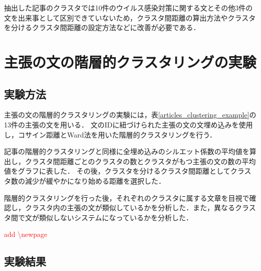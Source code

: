 \documentclass[12pt,a4j]{jreport}
\begin{document}
抽出した記事のクラスタでは10件のウイルス感染対策に関する文とその他3件の文を出来事として区別できていないため，クラスタ間距離の算出方法やクラスタを分けるクラスタ間距離の設定方法などに改善が必要である．

\section{主張の文の階層的クラスタリングの実験}
\label{section_sentence_clustering_experiment}

\subsection{実験方法}
主張の文の階層的クラスタリングの実験には，表\ref{articles_clustering_example}の13件の主張の文を用いる．
文のIDに紐づけられた主張の文の文埋め込みを使用し，コサイン距離とWard法を用いた階層的クラスタリングを行う．



記事の階層的クラスタリングと同様に全埋め込みのシルエット係数の平均値を算出し，クラスタ間距離ごとのクラスタの数とクラスタがもつ主張の文の数の平均値をグラフに表した．
その後，クラスタを分けるクラスタ間距離としてクラスタ数の減少が緩やかになり始める距離を選択した．

階層的クラスタリングを行った後，それぞれのクラスタに属する文章を目視で確認し，クラスタ内の主張の文が類似しているかを分析した．また，異なるクラスタ間で文が類似しないシステムになっているかを分析した．


\textcolor{red}{add \textbackslash newpage}
\newpage

\subsection{実験結果}
\end{document}

